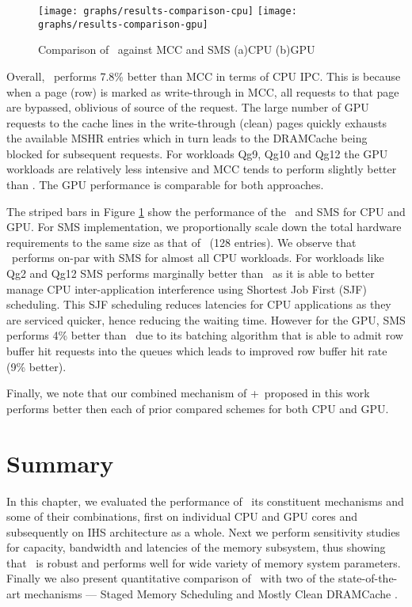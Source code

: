 \begin{figure}[!htb]
	\centering
	\texttt{[image: graphs/results-comparison-cpu]}
	\texttt{[image: graphs/results-comparison-gpu]}
	\caption{Comparison of \cachename\ against MCC \cite{mostly-clean} and SMS \cite{sms} (a)CPU (b)GPU}
	\label{results-comparison}
\end{figure}
 
\par Overall, \bypassname\ performs 7.8\% better than MCC in terms of CPU IPC. This is because when a page (row) is marked as write-through in MCC, all requests to that page are bypassed, oblivious of source of the request. The large number of GPU requests to the cache lines in the write-through (clean) pages quickly exhausts the available MSHR entries which in turn leads to the DRAMCache being blocked for subsequent requests. For workloads Qg9, Qg10 and Qg12 the GPU workloads are relatively less intensive and MCC tends to perform slightly better than \bypassname. The GPU performance is comparable for both approaches.
\par The striped bars in Figure \ref{results-comparison} show the performance of the \prioname\ and SMS for CPU and GPU. For SMS implementation, we proportionally scale down the total hardware requirements to the same size as that of \prioname\ (128 entries). We observe that \prioname\ performs on-par with SMS for almost all CPU workloads. For workloads like Qg2 and Qg12 SMS performs marginally better than \prioname\ as it is able to better manage CPU inter-application interference using Shortest Job First (SJF) scheduling. This SJF scheduling reduces latencies for CPU applications as they are serviced quicker, hence reducing the waiting time. However for the GPU, SMS performs 4\% better than \prioname\ due to its batching algorithm that is able to admit row buffer hit requests into the queues which leads to improved row buffer hit rate (9\% better). 
\par Finally, we note that our combined mechanism of \prioname+\bypassname\ proposed in this work performs better then each of prior compared schemes for both CPU and GPU.

\section{Summary}
In this chapter, we evaluated the performance of \cachename\, its constituent mechanisms and some of their combinations, first on individual CPU and GPU cores and subsequently on IHS architecture as a whole. Next we perform sensitivity studies for capacity, bandwidth and latencies of the memory subsystem, thus showing that \cachename\ is robust and performs well for wide variety of memory system parameters. Finally we also present quantitative comparison of \cachename\ with two of the state-of-the-art mechanisms --- Staged Memory Scheduling \cite{sms} and Mostly Clean DRAMCache \cite{mostly-clean}.